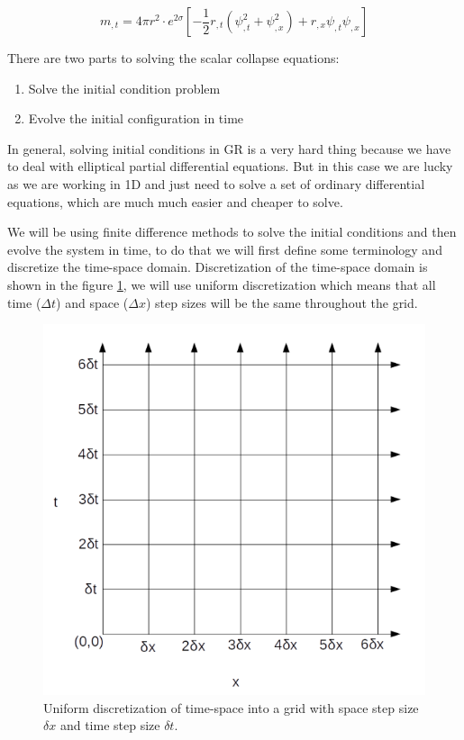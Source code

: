 \begin{equation}
    m_{, t}=4 \pi r^{2} \cdot e^{2 \sigma}\left[-\frac{1}{2} r_{, t}\left(\psi_{, t}^{2}+\psi_{, x}^{2}\right)+r_{, x} \psi_{, t} \psi_{, x}\right]
    \label{eqn:m_chap3}
\end{equation}

There are two parts to solving the scalar collapse equations:
\begin{enumerate}
    \item Solve the initial condition problem
    \item Evolve the initial configuration in time
\end{enumerate}

In general, solving initial conditions in GR is a very hard thing because we have to deal with elliptical partial differential equations. But in this case we are lucky as we are working in 1D and just need to solve a set of ordinary differential equations, which are much much easier and cheaper to solve.

We will be using finite difference methods to solve the initial conditions and then evolve the system in time, to do that we will first define some terminology and discretize the time-space domain.  Discretization of the time-space domain is shown in the figure \ref{fig:grid}, we will use uniform discretization which means that all time ($\Delta t$) and space ($\Delta x$) step sizes will be the same throughout the grid.



\begin{figure}[hbt!]
    \centering
    \includegraphics[width=\textwidth]{images/grid.png}
    \caption{Uniform discretization of time-space into a grid with space step size $\delta x$ and time step size $\delta t$.}
    \label{fig:grid}
\end{figure}

